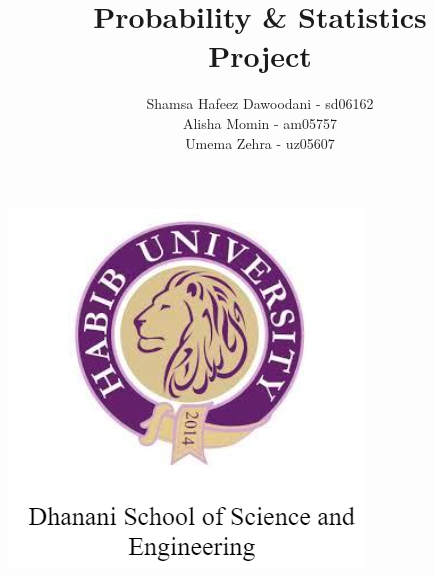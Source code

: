 \documentclass[answers]{exam}
\title{\textbf{Probability \& Statistics\\ Project}}
\author{Shamsa Hafeez Dawoodani - sd06162\\ Alisha Momin - am05757\\
Umema Zehra - uz05607}
\begin{document}
\maketitle
\begin{center}
    \includegraphics[scale=1.5]{page1.PNG}
\end{center}
\newpage
\noindent \hrulefill
\end{document}
